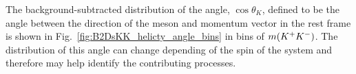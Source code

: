 The background-subtracted distribution of the angle, $\cos{\theta_{K}}$, defined to be the angle between the direction of the \Kp meson and \Bp momentum vector in the \Kp\Km rest frame is shown in Fig.~\ref{fig:B2DsKK_helicty_angle_bins} in bins of $m({{K}^+}{{K}^-})$. The distribution of this angle can change depending of the spin of the \Kp\Km system and therefore may help identify the contributing processes. 

